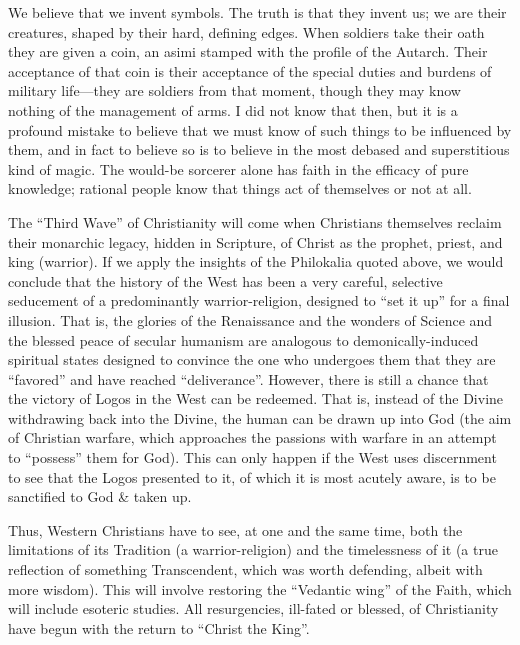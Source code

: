 \begin{quotex}
We believe that we invent symbols. The truth is that they invent us; we are their creatures, shaped by their hard, defining edges. When soldiers take their oath they are given a coin, an asimi stamped with the profile of the Autarch. Their acceptance of that coin is their acceptance of the special duties and burdens of military life---they are soldiers from that moment, though they may know nothing of the management of arms. I did not know that then, but it is a profound mistake to believe that we must know of such things to be influenced by them, and in fact to believe so is to believe in the most debased and superstitious kind of magic. The would-be sorcerer alone has faith in the efficacy of pure knowledge; rational people know that things act of themselves or not at all.

\end{quotex}


The ``Third Wave'' of Christianity will come when Christians themselves reclaim their monarchic legacy, hidden in Scripture, of Christ as the prophet, priest, and king (warrior). If we apply the insights of the Philokalia quoted above, we would conclude that the history of the West has been a very careful, selective seducement of a predominantly warrior-religion, designed to ``set it up'' for a final illusion. That is, the glories of the Renaissance and the wonders of Science and the blessed peace of secular humanism are analogous to demonically-induced spiritual states designed to convince the one who undergoes them that they are ``favored'' and have reached ``deliverance''. However, there is still a chance that the victory of Logos in the West can be redeemed. That is, instead of the Divine withdrawing back into the Divine, the human can be drawn up into God (the aim of Christian warfare, which approaches the passions with warfare in an attempt to ``possess'' them for God). This can only happen if the West uses discernment to see that the Logos presented to it, of which it is most acutely aware, is to be sanctified to God \& taken up.

Thus, Western Christians have to see, at one and the same time, both the limitations of its Tradition (a warrior-religion) and the timelessness of it (a true reflection of something Transcendent, which was worth defending, albeit with more wisdom). This will involve restoring the ``Vedantic wing'' of the Faith, which will include esoteric studies. All resurgencies, ill-fated or blessed, of Christianity have begun with the return to ``Christ the King''.


